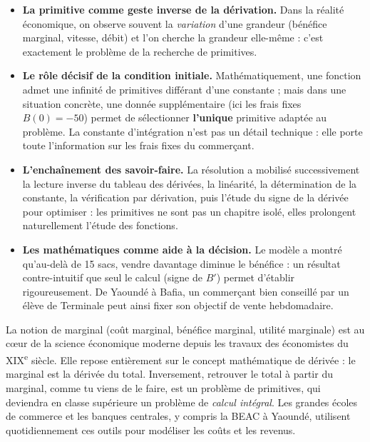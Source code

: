 \documentclass[11pt]{article}
\begin{document}
\begin{itemize}
\item \textbf{La primitive comme geste inverse de la dérivation.} Dans la réalité économique, on observe souvent la \emph{variation} d'une grandeur (bénéfice marginal, vitesse, débit) et l'on cherche la grandeur elle-même : c'est exactement le problème de la recherche de primitives.
\item \textbf{Le rôle décisif de la condition initiale.} Mathématiquement, une fonction admet une infinité de primitives différant d'une constante ; mais dans une situation concrète, une donnée supplémentaire (ici les frais fixes $B(0) = -50$) permet de sélectionner \textbf{l'unique} primitive adaptée au problème. La constante d'intégration n'est pas un détail technique : elle porte toute l'information sur les frais fixes du commerçant.
\item \textbf{L'enchaînement des savoir-faire.} La résolution a mobilisé successivement la lecture inverse du tableau des dérivées, la linéarité, la détermination de la constante, la vérification par dérivation, puis l'étude du signe de la dérivée pour optimiser : les primitives ne sont pas un chapitre isolé, elles prolongent naturellement l'étude des fonctions.
\item \textbf{Les mathématiques comme aide à la décision.} Le modèle a montré qu'au-delà de 15 sacs, vendre davantage diminue le bénéfice : un résultat contre-intuitif que seul le calcul (signe de $B'$) permet d'établir rigoureusement. De Yaoundé à Bafia, un commerçant bien conseillé par un élève de Terminale peut ainsi fixer son objectif de vente hebdomadaire.
\end{itemize}

\begin{savaistu}
La notion de \og marginal \fg{} (coût marginal, bénéfice marginal, utilité marginale) est au cœur de la science économique moderne depuis les travaux des économistes du XIX\textsuperscript{e} siècle. Elle repose entièrement sur le concept mathématique de dérivée : le marginal est la dérivée du total. Inversement, retrouver le total à partir du marginal, comme tu viens de le faire, est un problème de primitives, qui deviendra en classe supérieure un problème de \emph{calcul intégral}. Les grandes écoles de commerce et les banques centrales, y compris la BEAC à Yaoundé, utilisent quotidiennement ces outils pour modéliser les coûts et les revenus.
\end{savaistu}
\end{document}
